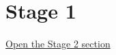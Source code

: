 \documentclass[11pt,twoside,openany]{book}
\begin{document}
\chapter*{Stage 1}
\href{stage2.pdf#nameddest=geometry-basics}{Open the Stage 2 section}
\end{document}
